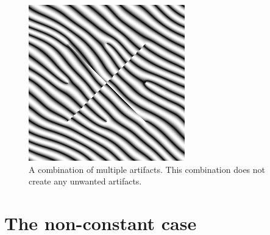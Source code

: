 \documentclass{utue} %
\begin{document}
\begin{figure}[ht]
  \centering
  \includegraphics[width=0.45\linewidth]{images/combiningArtifacts}
  \caption{A combination of multiple artifacts. This combination does not create any unwanted artifacts.}\label{fig:combiningArtifacts}
\end{figure}



\section{The non-constant case}



\FloatBarrier
\printbibliography
\end{document}
